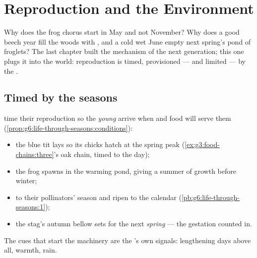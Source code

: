 \chapter{Reproduction and the Environment}\label{ch:g8:reproduction-and-environment}

Why does the frog chorus start in May and not November? Why
does a good beech year fill the woods with , and a
cold wet June empty next spring's pond of froglets? The last
chapter built the mechanism of the next generation; this one
plugs it into the world: reproduction is timed, provisioned
--- and limited --- by the .

\section{Timed by the seasons}

\begin{proposition}\label{prop:g8:reproduction-and-environment:timing}
 time their reproduction so the \emph{young} arrive
when  and food will serve them
(\cref{prop:g6:life-through-seasons:conditions}):
\begin{itemize}
  \item the blue tit lays so its chicks hatch at the spring
         peak (\cref{ex:g3:food-chains:three}'s
        oak chain, timed to the day);
  \item the frog spawns in the warming pond, giving
         a summer of growth before winter;
  \item {}  to their pollinators' season and
        ripen  to the  calendar
        (\cref{pb:g6:life-through-seasons:1});
  \item the stag's autumn bellow sets  for the next
        \emph{spring} --- the gestation counted in.
\end{itemize}
The cues that start the machinery are the 's
own signals: lengthening days above all, warmth, rain.
\end{proposition}
\admitted

